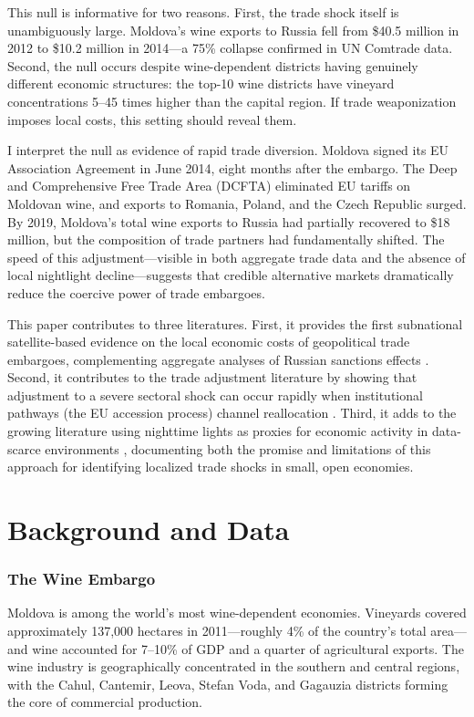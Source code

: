 \documentclass[12pt]{article}
\begin{document}
This null is informative for two reasons. First, the trade shock itself is unambiguously large. Moldova's wine exports to Russia fell from \$40.5 million in 2012 to \$10.2 million in 2014---a 75\% collapse confirmed in UN Comtrade data. Second, the null occurs despite wine-dependent districts having genuinely different economic structures: the top-10 wine districts have vineyard concentrations 5--45 times higher than the capital region. If trade weaponization imposes local costs, this setting should reveal them.

I interpret the null as evidence of rapid trade diversion. Moldova signed its EU Association Agreement in June 2014, eight months after the embargo. The Deep and Comprehensive Free Trade Area (DCFTA) eliminated EU tariffs on Moldovan wine, and exports to Romania, Poland, and the Czech Republic surged. By 2019, Moldova's total wine exports to Russia had partially recovered to \$18 million, but the composition of trade partners had fundamentally shifted. The speed of this adjustment---visible in both aggregate trade data and the absence of local nightlight decline---suggests that credible alternative markets dramatically reduce the coercive power of trade embargoes.

This paper contributes to three literatures. First, it provides the first subnational satellite-based evidence on the local economic costs of geopolitical trade embargoes, complementing aggregate analyses of Russian sanctions effects \citep{crozet2020friendly, ahn2019role}. Second, it contributes to the trade adjustment literature by showing that adjustment to a severe sectoral shock can occur rapidly when institutional pathways (the EU accession process) channel reallocation \citep{autor2013china, dix2017trade}. Third, it adds to the growing literature using nighttime lights as proxies for economic activity in data-scarce environments \citep{henderson2012measuring, gibson2020night}, documenting both the promise and limitations of this approach for identifying localized trade shocks in small, open economies.

\section{Background and Data}

\subsubsection*{The Wine Embargo} Moldova is among the world's most wine-dependent economies. Vineyards covered approximately 137,000 hectares in 2011---roughly 4\% of the country's total area---and wine accounted for 7--10\% of GDP and a quarter of agricultural exports. The wine industry is geographically concentrated in the southern and central regions, with the Cahul, Cantemir, Leova, Stefan Voda, and Gagauzia districts forming the core of commercial production.
\end{document}
